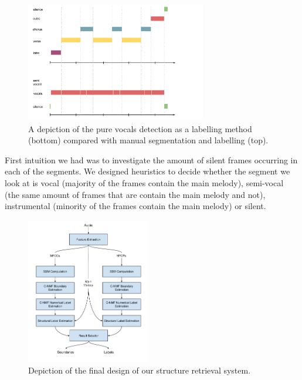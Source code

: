\begin{figure}[h]
	\centering
   \includegraphics[width=0.7\textwidth]{Figures/BeatlesSegmentation}
\caption{A depiction of the pure vocals detection as a labelling method (bottom) compared with manual segmentation and labelling (top).}
\label{fig:vocalsimple}
\end{figure}

First intuition we had was to investigate the amount of silent frames occurring in each of the segments. We designed heuristics to decide whether the segment we look at is vocal (majority of the frames contain the main melody), semi-vocal (the same amount of frames that are contain the main melody and not), instrumental (minority of the frames contain the main melody) or silent. 


\begin{figure}
\vspace{-30pt}
  \begin{center}
    \includegraphics[width=0.48\textwidth]{Figures/Structure-Retrieval}
  \end{center}
  \caption{Depiction of the final design of our structure retrieval system.}
\label{fig:NMF}
\end{figure}


